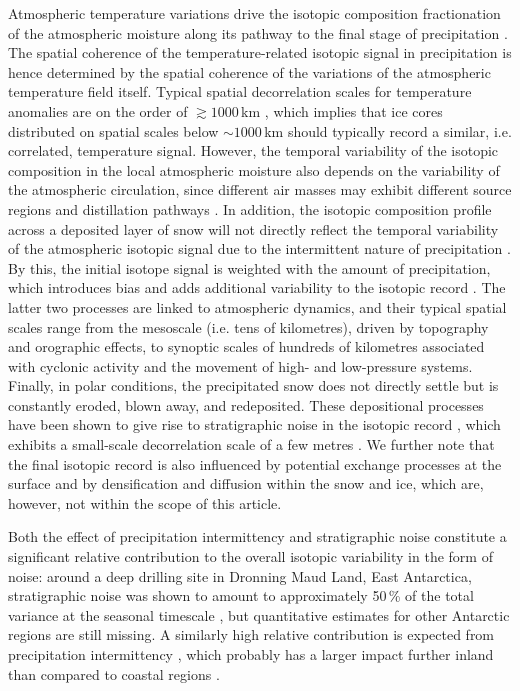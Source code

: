 \documentclass[cp]{copernicus}
\begin{document}
Atmospheric temperature variations drive the isotopic composition fractionation
of the atmospheric moisture along its pathway to the final stage of
precipitation \citep{Dansgaard1964,Jouzel1984}. The spatial coherence of the
temperature-related isotopic signal in precipitation is hence determined by the
spatial coherence of the variations of the atmospheric temperature field
itself. Typical spatial decorrelation scales for temperature anomalies are on
the order of $\gtrsim1000$\,km \citep{Jones1997}, which implies that ice cores
distributed on spatial scales below $\sim 1000$\,km should typically record a
similar, i.e. correlated, temperature signal. However, the temporal variability
of the isotopic composition in the local atmospheric moisture also depends on
the variability of the atmospheric circulation, since different air masses may
exhibit different source regions and distillation pathways \citep{Schlosser2004,
Sodemann2008a,Birks2009,Kuttel2012}. In addition, the isotopic composition
profile across a deposited layer of snow will not directly reflect the temporal
variability of the atmospheric isotopic signal due to the intermittent nature of
precipitation \citep{Schleiss2015}. By this, the initial isotope signal is
weighted with the amount of precipitation, which introduces bias
\citep{Steig1994,Laepple2011a} and adds additional variability to the isotopic
record \citep{Persson2011,Casado2020}. The latter two processes are linked to
atmospheric dynamics, and their typical spatial scales range from the mesoscale
(i.e. tens of kilometres), driven by topography and orographic effects, to
synoptic scales of hundreds of kilometres associated with cyclonic activity and
the movement of high- and low-pressure systems. Finally, in polar conditions,
the precipitated snow does not directly settle but is constantly eroded, blown
away, and redeposited. These depositional processes have been shown to give rise
to stratigraphic noise in the isotopic record
\citep{Fisher1985,Munch2016,Laepple2016}, which exhibits a small-scale
decorrelation scale of a few metres \citep{Munch2016}. We further note that the
final isotopic record is also influenced by potential exchange processes at the
surface and by densification and diffusion within the snow and ice, which are,
however, not within the scope of this article.

Both the effect of precipitation intermittency and stratigraphic noise
constitute a significant relative contribution to the overall isotopic
variability in the form of noise: around a deep drilling site in Dronning Maud
Land, East Antarctica, stratigraphic noise was shown to amount to approximately
50\,\% of the total variance at the seasonal timescale \citep{Munch2016}, but
quantitative estimates for other Antarctic regions are still missing. A
similarly high relative contribution is expected from precipitation
intermittency \citep{Laepple2018}, which probably has a larger impact further
inland than compared to coastal regions \citep{Casado2020,Hatvani2017}.
\end{document}
